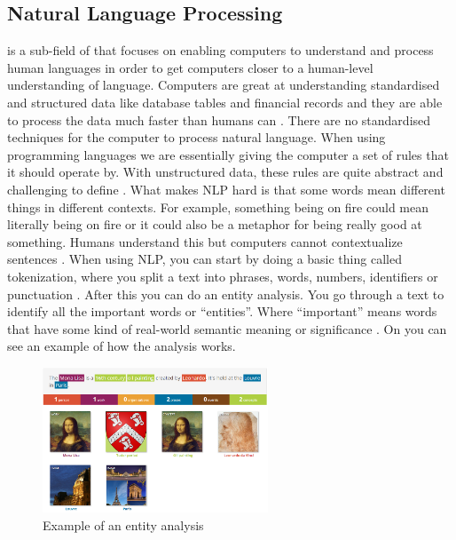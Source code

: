 \subsection{Natural Language Processing}
\label{subsub:natural_language_processing}
 is a sub-field of  that focuses on enabling computers to understand and process human languages in order to get computers closer to a human-level understanding of language.
\newline\newline
Computers are great at understanding standardised and structured data like database tables and financial records and they are able to process the data much faster than humans can \cite{Seif2018AnProcessing}. 
\newline\newline
There are no standardised techniques for the computer to process natural language. When using programming languages we are essentially giving the computer a set of rules that it should operate by. With unstructured data, these rules are quite abstract and challenging to define \cite{Seif2018AnProcessing}.
\newline\newline
What makes NLP hard is that some words mean different things in different contexts. For example, something being on fire could mean literally being on fire or it could also be a metaphor for being really good at something. Humans understand this but computers cannot contextualize sentences \cite{Seif2018AnProcessing}.
\newline\newline
When using NLP, you can start by doing a basic thing called tokenization, where you split a text into phrases, words, numbers, identifiers or punctuation \cite{NelsonNaturalTechnologies}. After this you can do an entity analysis. You go through a text to identify all the important words or \enquote{entities}. Where \enquote{important} means words that have some kind of real-world semantic meaning or significance \cite{NelsonNaturalTechnologies}. On  you can see an example of how the analysis works.

\begin{figure}[H]
    \centering
    \includegraphics[width=0.6\textwidth]{figures/EntityAnalysis.png}
    \caption{Example of an entity analysis \cite{DemoAPI}}
    \label{fig:EntityAnalysis}
\end{figure}

